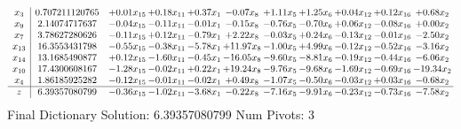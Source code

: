 \documentclass[9pt]{article}
\begin{document}
 \[\begin{array}{c| c c@{\hskip 2pt} c@{\hskip 2pt} c@{\hskip 2pt} c@{\hskip 2pt} c@{\hskip 2pt} c@{\hskip 2pt} c@{\hskip 2pt} c@{\hskip 2pt} c@{\hskip 2pt} }
 x_{3}   &  0.707211120765 & +  0.01 x_{15} & +  0.18 x_{11} & +  0.37 x_{1} & -0.07 x_{8} & +  1.11 x_{5} & +  1.25 x_{6} & +  0.04 x_{12} & +  0.12 x_{16} & +  0.68 x_{2}\\
 x_{9}   &  2.14074717637 & -0.04 x_{15} & -0.11 x_{11} & -0.01 x_{1} & -0.15 x_{8} & -0.76 x_{5} & -0.70 x_{6} & +  0.06 x_{12} & -0.08 x_{16} & +  0.00 x_{2}\\
 x_{7}   &  3.78627280626 & -0.11 x_{15} & +  0.12 x_{11} & -0.79 x_{1} & +  2.22 x_{8} & -0.03 x_{5} & +  0.24 x_{6} & -0.13 x_{12} & -0.01 x_{16} & -2.50 x_{2}\\
 x_{13}   &  16.3553431798 & -0.55 x_{15} & -0.38 x_{11} & -5.78 x_{1} & + 11.97 x_{8} & -1.00 x_{5} & +  4.99 x_{6} & -0.12 x_{12} & -0.52 x_{16} & -3.16 x_{2}\\
 x_{14}   &  13.1685490877 & +  0.12 x_{15} & -1.60 x_{11} & -0.45 x_{1} & -16.05 x_{8} & -9.60 x_{5} & -8.81 x_{6} & -0.19 x_{12} & -0.44 x_{16} & -6.06 x_{2}\\
 x_{10}   &  17.4300608167 & -1.28 x_{15} & -0.02 x_{11} & +  0.22 x_{1} & + 19.24 x_{8} & -9.76 x_{5} & -9.68 x_{6} & -1.69 x_{12} & -0.69 x_{16} & -19.34 x_{2}\\
 x_{4}   &  1.86185925282 & -0.12 x_{15} & -0.01 x_{11} & -0.02 x_{1} & +  0.49 x_{8} & -1.07 x_{5} & -0.50 x_{6} & -0.03 x_{12} & +  0.03 x_{16} & -0.68 x_{2}\\
\hline
z    &  6.39357080799 & -0.36 x_{15} & -1.02 x_{11} & -3.68 x_{1} & -0.22 x_{8} & -7.16 x_{5} & -9.91 x_{6} & -0.23 x_{12} & -0.73 x_{16} & -7.58 x_{2}\\
\end{array}\]
Final Dictionary
Solution:  6.39357080799
Num Pivots:  3
\end{document}
